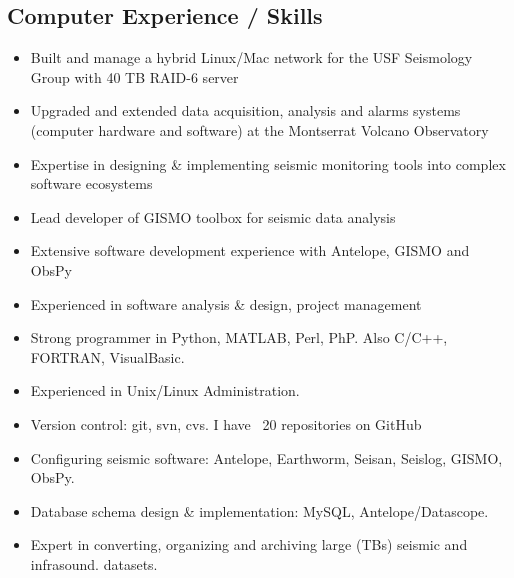 \documentclass[margin,line]{res}
\begin{document}
\begin{resume}
\section{\sc Computer Experience / Skills}
\begin{itemize}
\item Built and manage a hybrid Linux/Mac network for the USF Seismology Group with 40 TB RAID-6 server
\item Upgraded and extended data acquisition, analysis and alarms systems (computer hardware and software) at the Montserrat Volcano Observatory
\item Expertise in designing \& implementing seismic monitoring tools into complex software ecosystems 
\item Lead developer of GISMO toolbox for seismic data analysis
\item Extensive software development experience with Antelope, GISMO and ObsPy
\item Experienced in software analysis \& design, project management
\item Strong programmer in Python, MATLAB, Perl, PhP. Also C/C++, FORTRAN, VisualBasic.
\item Experienced in Unix/Linux Administration.
\item Version control: git, svn, cvs. I have ~20 repositories on GitHub
\item Configuring seismic software: Antelope, Earthworm, Seisan, Seislog, GISMO, ObsPy.
\item Database schema design \& implementation: MySQL, Antelope/Datascope.
\item Expert in converting, organizing and archiving large (TBs) seismic and infrasound. datasets.
\\

\end{itemize}
\end{resume}
\end{document}
